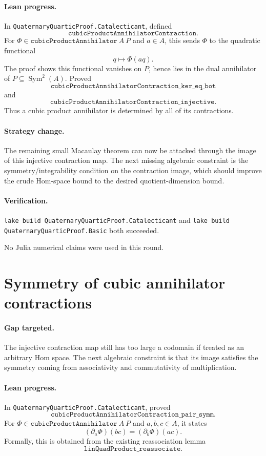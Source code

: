 \documentclass[11pt]{article}
\begin{document}
\paragraph{Lean progress.}
In \texttt{QuaternaryQuarticProof.Catalecticant}, defined
\[
\texttt{cubicProductAnnihilatorContraction}.
\]
For
\(\Phi\in\texttt{cubicProductAnnihilator}\ A\ P\) and \(a\in A\), this sends
\(\Phi\) to the quadratic functional
\[
q\mapsto \Phi(aq).
\]
The proof shows this functional vanishes on \(P\), hence lies in the dual
annihilator of \(P\subseteq\operatorname{Sym}^2(A)\).  Proved
\[
\texttt{cubicProductAnnihilatorContraction\_ker\_eq\_bot}
\]
and
\[
\texttt{cubicProductAnnihilatorContraction\_injective}.
\]
Thus a cubic product annihilator is determined by all of its contractions.

\paragraph{Strategy change.}
The remaining small Macaulay theorem can now be attacked through the image of
this injective contraction map.  The next missing algebraic constraint is the
symmetry/integrability condition on the contraction image, which should
improve the crude Hom-space bound to the desired quotient-dimension bound.

\paragraph{Verification.}
\texttt{lake build QuaternaryQuarticProof.Catalecticant} and
\texttt{lake build QuaternaryQuarticProof.Basic} both succeeded.

No Julia numerical claims were used in this round.

\section*{Symmetry of cubic annihilator contractions}

\paragraph{Gap targeted.}
The injective contraction map still has too large a codomain if treated as an
arbitrary Hom space.  The next algebraic constraint is that its image satisfies
the symmetry coming from associativity and commutativity of multiplication.

\paragraph{Lean progress.}
In \texttt{QuaternaryQuarticProof.Catalecticant}, proved
\[
\texttt{cubicProductAnnihilatorContraction\_pair\_symm}.
\]
For \(\Phi\in\texttt{cubicProductAnnihilator}\ A\ P\) and
\(a,b,c\in A\), it states
\[
(\partial_a\Phi)(bc)=(\partial_b\Phi)(ac).
\]
Formally, this is obtained from the existing reassociation lemma
\[
\texttt{linQuadProduct\_reassociate}.
\]
\end{document}
